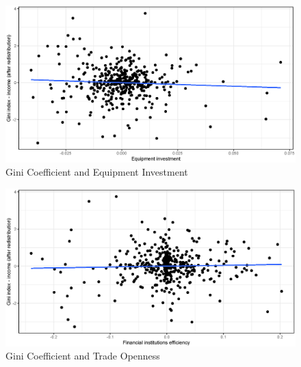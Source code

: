 \documentclass[a4paper,11pt]{article}
\begin{document}
\begin{figure}
    \caption{Gini Coefficient and Equipment Investment}
\includegraphics[width=\textwidth, keepaspectratio]{figures/EquipIGiniNet_dm}
\end{figure}

\begin{figure}
    \caption{Gini Coefficient and Trade Openness}
\includegraphics[width=\textwidth, keepaspectratio]{figures/TradeOpenGiniNet_dm}
\end{figure}
\end{document}
